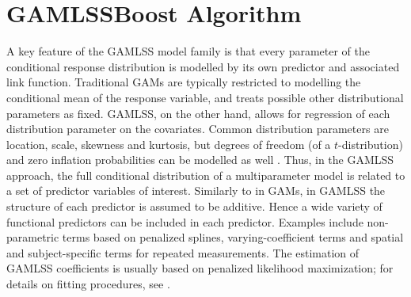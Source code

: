 \section{GAMLSSBoost Algorithm}\label{sec:gamlssboost}
A key feature of the GAMLSS model family is that every parameter of the conditional response distribution is modelled by its own predictor and associated link function.
Traditional GAMs \citep{gam-book} are typically restricted to modelling the conditional mean of the response variable, and treats possible other distributional parameters as fixed.
GAMLSS, on the other hand, allows for regression of each distribution parameter on the covariates.
Common distribution parameters are location, scale, skewness and kurtosis, but degrees of freedom (of a $t$-distribution) and zero inflation probabilities can be modelled as well \citep{gamboostlss-paper}.
Thus, in the GAMLSS approach, the full conditional distribution of a multiparameter model is related to a set of predictor variables of interest.
Similarly to in GAMs, in GAMLSS the structure of each predictor is assumed to be additive.
Hence a wide variety of functional predictors can be included in each predictor.
Examples include non-parametric terms based on penalized splines, varying-coefficient terms and spatial and subject-specific terms for repeated measurements.
The estimation of GAMLSS coefficients is usually based on penalized likelihood maximization; for details on fitting procedures, see \citet{gamlss}.

